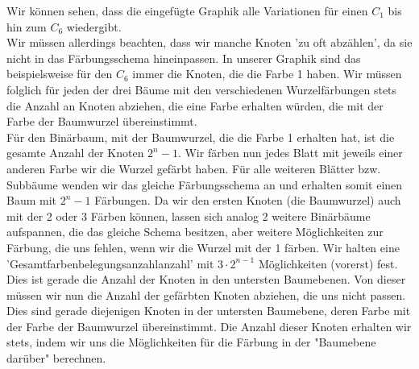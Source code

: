      Wir können sehen, dass die eingefügte Graphik alle Variationen für einen $C_1$ bis hin zum $C_6$  wiedergibt. \\
     Wir müssen allerdings beachten, dass wir manche Knoten 'zu oft abzählen', da sie nicht in das Färbungsschema hineinpassen. In unserer Graphik sind das beispielsweise für den $C_6$  immer die Knoten, die die Farbe 1 haben. Wir müssen folglich für jeden der drei Bäume  mit den verschiedenen Wurzelfärbungen stets die Anzahl an Knoten abziehen, die eine Farbe erhalten würden, die mit der Farbe der Baumwurzel übereinstimmt.\\
     Für den Binärbaum, mit der Baumwurzel, die die Farbe 1 erhalten hat, ist die gesamte Anzahl der Knoten $2^n-1$. Wir färben nun jedes Blatt mit jeweils einer anderen Farbe wir die Wurzel gefärbt haben. Für alle weiteren Blätter bzw. Subbäume wenden wir das gleiche Färbungsschema an und erhalten somit einen Baum mit $2^n-1$ Färbungen. Da wir den ersten Knoten (die Baumwurzel) auch mit der 2 oder 3 Färben können, lassen sich analog 2 weitere Binärbäume aufspannen, die das gleiche Schema besitzen, aber weitere Möglichkeiten zur Färbung, die uns fehlen, wenn wir die Wurzel mit der 1 färben. Wir halten eine 'Gesamtfarbenbelegungsanzahlanzahl' mit $3\cdot 2^{n-1}$ Möglichkeiten (vorerst) fest. Dies ist gerade die Anzahl der Knoten in den untersten Baumebenen.
     Von dieser müssen wir nun die Anzahl der gefärbten Knoten abziehen, die uns nicht passen. Dies sind gerade diejenigen Knoten in der untersten Baumebene, deren Farbe mit der Farbe der Baumwurzel übereinstimmt. Die Anzahl dieser Knoten erhalten wir stets, indem wir uns die Möglichkeiten für die Färbung in der "Baumebene darüber" berechnen.
     
